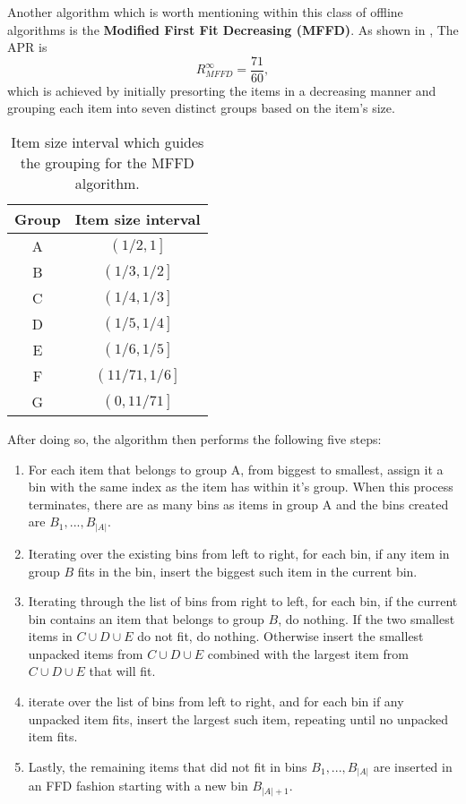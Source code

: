Another algorithm which is worth mentioning within this class of offline
algorithms is the \textbf{Modified First Fit Decreasing (MFFD)}. As shown in
\cite{johnson19857160}, The APR is
\begin{equation}
    R_{MFFD}^\infty = \frac{71}{60},
\end{equation}
which is achieved by initially presorting the items in a decreasing manner and
grouping each item into seven distinct groups based on the item's size. 

\begin{table}[H]
\caption{Item size interval which guides the grouping for the MFFD algorithm.}
\begin{center}
\begin{tabular}{ |c|c| } 
    \hline
    Group & Item size interval \\ 
    \hline
    A & $\left( 1/2, 1 \right]$ \\ 
    B & $\left( 1/3, 1/2 \right]$ \\ 
    C & $\left( 1/4, 1/3 \right]$ \\ 
    D & $\left( 1/5, 1/4 \right]$ \\ 
    E & $\left( 1/6, 1/5 \right]$ \\ 
    F & $\left( 11/71, 1/6 \right]$ \\ 
    G & $\left( 0, 11/71 \right]$ \\ 
\hline
\end{tabular}
\end{center}
\end{table}

After doing so, the algorithm then performs the following five steps: 
\begin{enumerate}
    \item For each item that belongs to group A, from biggest to smallest,
        assign it a bin with the same index as the item has within it's group.
        When this process terminates, there are as many bins as items in group A
        and the bins created are $B_1, ..., B_{|A|}$.
    \item Iterating over the existing bins from left to right, for each bin, if
        any item in group $B$ fits in the bin, insert the biggest such item in
        the current bin.
    \item Iterating through the list of bins from right to left, for each bin,
        if the current bin contains an item that belongs to group $B$, do
        nothing. If the two smallest items in $C \cup D \cup E$ do not fit, do
        nothing. Otherwise insert the smallest unpacked items from $C \cup D
        \cup E$ combined with the largest item from $C \cup D \cup E$ that will
        fit.
    \item iterate over the list of bins from left to right, and for each bin if
        any unpacked item fits, insert the largest such item, repeating until no
        unpacked item fits.
    \item Lastly, the remaining items that did not fit in bins $B_1, ...,
        B_{|A|}$ are inserted in an FFD fashion starting with a new bin
        $B_{|A|+1}$. 
\end{enumerate}


